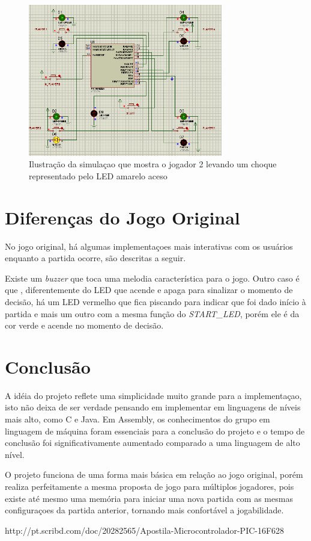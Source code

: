 \documentclass[article]{IEEEtran}
\begin{document}
	\begin{figure}	
		\centering
		\includegraphics[width=8.5cm]{./choqueP2.png}
		\caption{Ilustração da simulaçao que mostra o jogador 2 levando um choque representado pelo LED amarelo aceso}
 		\label{fig:choqueP2}
	\end{figure}

\section{Diferenças do Jogo Original}
No jogo original, há algumas implementaçoes mais interativas com os usuários enquanto a partida ocorre, são descritas a seguir.

Existe um \textit{buzzer} que toca uma melodia característica para o jogo. Outro caso é que , diferentemente do LED que acende e apaga para sinalizar o momento de decisão, há um LED vermelho que fica piscando para indicar que foi dado início à partida e mais um outro com a mesma função do \textit{START\_LED}, porém ele é da cor verde e acende no momento de decisão.

\section{Conclusão}
A idéia do projeto reflete uma simplicidade muito grande para a implementaçao, isto não deixa de ser verdade pensando em implementar em linguagens de níveis mais alto, como C e Java. Em Assembly, os conhecimentos do grupo em linguagem de máquina foram essenciais para a conclusão do projeto e o tempo de conclusão foi significativamente aumentado comparado a uma linguagem de alto nível.

O projeto funciona de uma forma mais básica em relação ao jogo original, porém realiza perfeitamente a mesma proposta de jogo para múltiplos jogadores, pois existe até mesmo uma memória para iniciar uma nova partida com as mesmas configuraçoes da partida anterior, tornando mais confortável a jogabilidade.  

\begin{thebibliography}{eu}
http://pt.scribd.com/doc/20282565/Apostila-Microcontrolador-PIC-16F628
\end{thebibliography}
\end{document}
